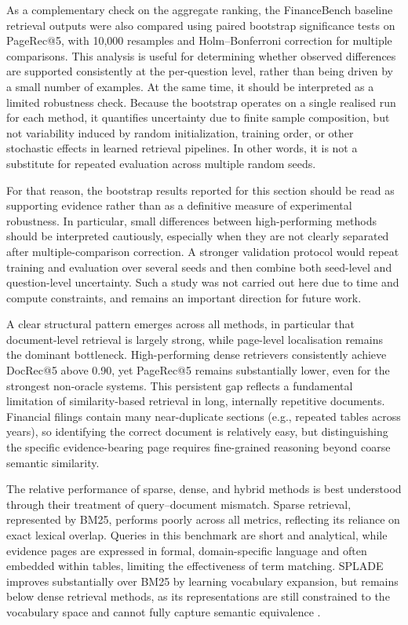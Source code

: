 \documentclass[12pt,twoside,maitrise]{dms}
\newcounter{example}
\theoremstyle{definition}
\numberwithin{equation}{section}
\numberwithin{table}{chapter}
\numberwithin{figure}{chapter}
\begin{document}
As a complementary check on the aggregate ranking, the FinanceBench baseline
retrieval outputs were also compared using paired bootstrap significance tests on
PageRec@5, with 10{,}000 resamples and Holm--Bonferroni correction for multiple
comparisons. This analysis is useful for determining whether observed differences
are supported consistently at the per-question level, rather than being driven by
a small number of examples. At the same time, it should be interpreted as a
limited robustness check. Because the bootstrap operates on a single realised run
for each method, it quantifies uncertainty due to finite sample composition, but
not variability induced by random initialization, training order, or other
stochastic effects in learned retrieval pipelines. In other words, it is not a
substitute for repeated evaluation across multiple random seeds.

For that reason, the bootstrap results reported for this section should be read as
supporting evidence rather than as a definitive measure of experimental
robustness. In particular, small differences between high-performing methods
should be interpreted cautiously, especially when they are not clearly separated
after multiple-comparison correction. A stronger validation protocol would repeat
training and evaluation over several seeds and then combine both seed-level and
question-level uncertainty. Such a study was not carried out here due to time and
compute constraints, and remains an important direction for future work.

A clear structural pattern emerges across all methods, in particular that document-level retrieval is largely strong, while page-level localisation remains the dominant bottleneck. High-performing dense retrievers consistently achieve DocRec@5 above 0.90, yet PageRec@5 remains substantially lower, even for the strongest non-oracle systems. This persistent gap reflects a fundamental limitation of similarity-based retrieval in long, internally repetitive documents. Financial filings contain many near-duplicate sections (e.g., repeated tables across years), so identifying the correct document is relatively easy, but distinguishing the specific evidence-bearing page requires fine-grained reasoning beyond coarse semantic similarity. 

The relative performance of sparse, dense, and hybrid methods is best understood through their treatment of query–document mismatch. Sparse retrieval, represented by BM25, performs poorly across all metrics, reflecting its reliance on exact lexical overlap. Queries in this benchmark are short and analytical, while evidence pages are expressed in formal, domain-specific language and often embedded within tables, limiting the effectiveness of term matching. SPLADE improves substantially over BM25 by learning vocabulary expansion, but remains below dense retrieval methods, as its representations are still constrained to the vocabulary space and cannot fully capture semantic equivalence \citep{formal2021splade}.
\end{document}
